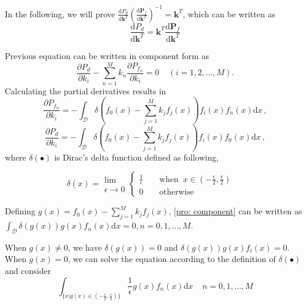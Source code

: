 \documentclass[12pt,journal,a4paper,twoside,doublecolumn]{IEEEtran}
\begin{document}
\begin{spacing}{1.0}
In the following, we will prove $ \frac{\mathrm{d}P_d}{\mathrm{d}\mathbf{k}^T}(
\frac{\mathrm{d}\mathbf{P}_f}{\mathrm{d}\mathbf{k}^T}
)^{-1} = \mathbf{k}^T
$, which can be written as
\begin{equation}
\label{pro: vec}
\frac{\mathrm{d}P_d}{\mathrm{d}\mathbf{k}^T} = \mathbf{k}^T \frac{\mathrm{d}\mathbf{P}_f}{\mathrm{d}\mathbf{k}^T}
\end{equation}

Previous equation can be written in component form as
\begin{equation}
\label{pro: component}
\frac{\partial P_d}{\partial k_i} - \sum_{n=1}^{M}k_n\frac{\partial P_{f_n}}{\partial k_i} = 0 \;\;\;\;(i=1, 2, ..., M).
\end{equation}
Calculating the  partial derivatives results in
\begin{equation}
\label{pro: Pf par k}
\frac{\partial P_{f_n}}{ \partial k_i} = - \int_{\mathcal{D}}\delta (f_0(x) - \sum_{j=1}^{M}k_jf_j(x))f_i(x)f_n(x) \mathrm{d}x\,,
\end{equation}
\label{pro: Pd par k}
\begin{equation}\frac{\partial P_d}{ \partial k_i} = - \int_{\mathcal{D}}\delta (f_0(x) - \sum_{j=1}^{M}k_jf_j(x))f_i(x)f_0(x) \mathrm{d}x\,,
\end{equation}
where $\delta(\bullet)$ is Dirac's delta function defined as following,

\begin{equation}
\label{pro: delta}
\delta(x) = \substack{\lim \\ \epsilon \rightarrow 0} \begin{cases}
\frac{1}{\epsilon}\;\;\;\;&\text{when} \;\;x \in (-\frac{\epsilon}{2}, \frac{\epsilon}{2})\\
0\;\;\;\;&\text{otherwise}
\end{cases} \;\;\;\;
\end{equation}

Defining $g(x) = f_0(x) - \sum_{j=1}^{M} k_jf_j(x)$, \eqref{pro: component} can be written as $\int_{\mathcal{D}}\delta(g(x))g(x)f_n(x)\mathrm{d}x = 0, n = 0, 1, ..., M$.

When $g(x) \neq 0$, we have $\delta(g(x)) = 0$ and $\delta(g(x))g(x)f_i(x) = 0$.   When  $g(x) = 0$, we can solve the equation according to the definition of $\delta(\bullet)$ and consider
\begin{equation}
\label{pro: important}
\int_{\{x|g(x)\in (-\frac{\epsilon}{2}, \frac{\epsilon}{2})\}} \frac{1}{\epsilon} g(x)f_n(x) \mathrm{d}x\;\;\;\;n=0, 1, ..., M
\end{equation}


\end{spacing}
\end{document}
